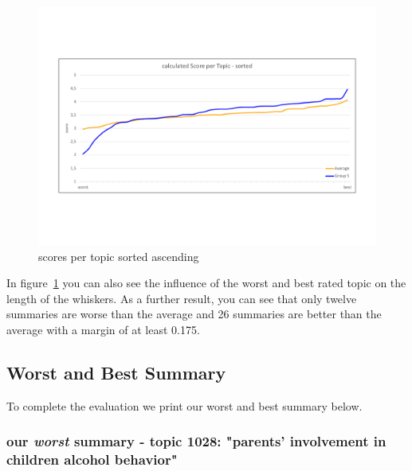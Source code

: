 \begin{figure}[H]
	\centering
	\includegraphics[trim=0 150 0 150, width=\textwidth]{img/score_per_topic_sorted.pdf}
	\caption{scores per topic sorted ascending}
	\label{fig:spts}
\end{figure}

In figure~\ref{fig:spts} you can also see the influence of the worst and best rated topic on the length of the whiskers.
As a further result, you can see that only twelve summaries are worse than the average and 26 summaries are better than the average with a margin of at least 0.175.

\subsection{Worst and Best Summary}
To complete the evaluation we print our worst and best summary below.

\subsubsection*{our \emph{worst} summary - topic 1028: "parents' involvement in children alcohol behavior"}

